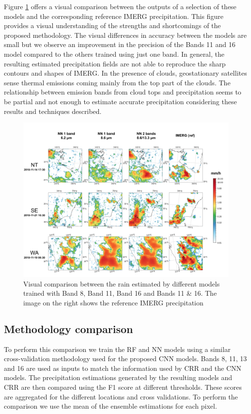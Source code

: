 \documentclass[3p,times]{elsarticle}
\begin{document}
Figure \ref{output_cmp} offers a visual comparison between the outputs of a selection of these models and the corresponding reference IMERG precipitation. This figure provides a visual understanding of the strengths and shortcomings of the proposed methodology. The visual differences in accuracy between the models are small but we observe an improvement in the precision of the Bands 11 and 16 model compared to the others trained using just one band. In general, the resulting estimated precipitation fields are not able to reproduce the sharp contours and shapes of IMERG. In the presence of clouds, geostationary satellites sense thermal emissions coming mainly from the top part of the clouds. The relationship between emission bands from cloud tops and precipitation seems to be partial and not enough to estimate accurate precipitation considering these results and techniques described.

\begin{figure}%
    \includegraphics[width=14cm]{output_cmp.png}
	\caption{Visual comparison between the rain estimated by different models trained with Band 8, Band 11, Band 16 and Bands 11 \& 16. The image on the right shows the reference IMERG precipitation}%
    \label{output_cmp}%
\end{figure}

\subsection{Methodology comparison}

To perform this comparison we train the RF and NN models using a similar cross-validation methodology used for the proposed CNN models. Bands 8, 11, 13 and 16 are used as inputs to match the information used by CRR and the CNN models. The precipitation estimations generated by the resulting models and CRR are then compared using the F1 score at different thresholds. These scores are aggregated for the different locations and cross validations. To perform the comparison we use the mean of the ensemble estimations for each pixel.
\end{document}
